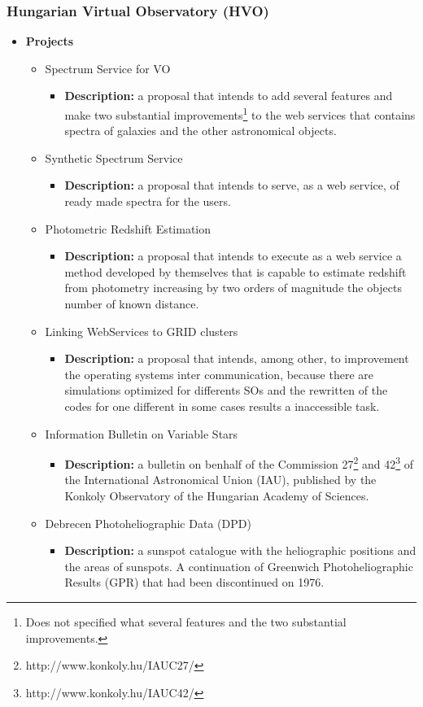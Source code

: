 \subsubsection{Hungarian Virtual Observatory \cite{website:hvo-home} (HVO)}

\begin{itemize}
\item \textbf{Projects}
\begin{itemize}
\item Spectrum Service for VO
\begin{itemize}
\item \textbf{Description:} a proposal that intends to add several features and
make two substantial improvements\footnote{Does not specified what several
features and the two substantial improvements.} to the web services that
contains spectra of galaxies and the other astronomical objects. 
\end{itemize}
\item Synthetic Spectrum Service
\begin{itemize}
\item \textbf{Description:} a proposal that intends to serve, as a web service,
of ready made spectra for the users.
\end{itemize}
\item Photometric Redshift Estimation
\begin{itemize}
\item \textbf{Description:} a proposal that intends to execute as a web service
a method developed by themselves that is capable to estimate redshift from
photometry increasing by two orders of magnitude the objects number of known
distance. 
\end{itemize}
\item Linking WebServices to GRID clusters
\begin{itemize}
\item \textbf{Description:} a proposal that intends, among other, to improvement
the operating systems inter communication, because there are simulations
optimized for differents SOs and the rewritten of the codes for one different in
some cases results a inaccessible task.
\end{itemize}
\item Information Bulletin on Variable Stars
\begin{itemize}
\item \textbf{Description:} a bulletin on benhalf of the Commission
27\footnote{http://www.konkoly.hu/IAUC27/} and
42\footnote{http://www.konkoly.hu/IAUC42/} of the International Astronomical
Union (IAU), published by the Konkoly Observatory of the Hungarian Academy of
Sciences. 
\end{itemize}
\item Debrecen Photoheliographic Data (DPD)
\begin{itemize}
\item \textbf{Description:} a sunspot catalogue with the heliographic positions
and the areas of sunspots. A continuation of Greenwich Photoheliographic
Results (GPR) that had been discontinued on 1976.
\end{itemize}
\end{itemize}
\end{itemize}

